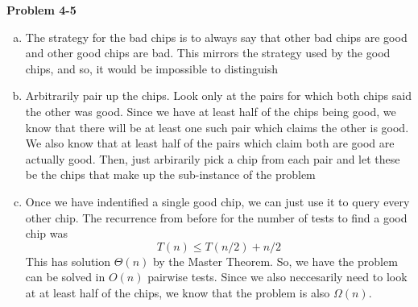 \documentclass{article}
\begin{document}
\noindent\textbf{Problem 4-5}\\

\begin{enumerate}[a.]

\item
The strategy for the bad chips is to always say that other bad chips are good and other good chips are bad. This mirrors the strategy used by the good chips, and so, it would be impossible to distinguish

\item
Arbitrarily pair up the chips. Look only at the pairs for which both chips said the other was good. Since we have at least half of the chips being good, we know that there will be at least one such pair which claims the other is good. We also know that at least half of the pairs which claim both are good are actually good. Then, just arbirarily pick a chip from each pair and let these be the chips that make up the sub-instance of the problem

\item
Once we have indentified a single good chip, we can just use it to query every other chip. 
The recurrence from before for the number of tests to find a good chip was
\[
T(n) \le T(n/2) + n/2
\]
This has solution $\Theta(n)$ by the Master Theorem. So, we have the problem can be solved in $O(n)$ pairwise tests. Since we also neccesarily need to look at at least half of the chips, we know that the problem is also $\Omega(n)$.

\end{enumerate}
\end{document}
